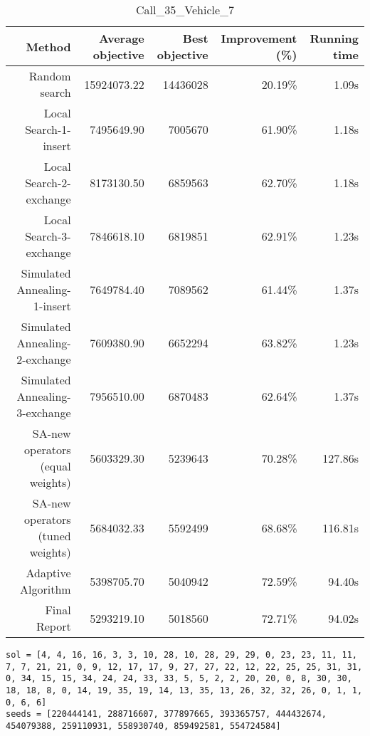 \begin{table}[ht]
\centering
\caption{Call\_35\_Vehicle\_7}
\label{tab:call35vehicle7}
\begin{tabular}{|r|r|r|r|r|}
Method & Average objective & Best objective & Improvement (\%) & Running time \\
\hline
Random search & 15924073.22 & 14436028 & 20.19\% & 1.09s\\
Local Search-1-insert & 7495649.90 & 7005670 & 61.90\% & 1.18s\\
Local Search-2-exchange & 8173130.50 & 6859563 & 62.70\% & 1.18s\\
Local Search-3-exchange & 7846618.10 & 6819851 & 62.91\% & 1.23s\\
Simulated Annealing-1-insert & 7649784.40 & 7089562 & 61.44\% & 1.37s\\
Simulated Annealing-2-exchange & 7609380.90 & 6652294 & 63.82\% & 1.23s\\
Simulated Annealing-3-exchange & 7956510.00 & 6870483 & 62.64\% & 1.37s\\
SA-new operators (equal weights) & 5603329.30 & 5239643 & 70.28\% & 127.86s\\
SA-new operators (tuned weights) & 5684032.33 & 5592499 & 68.68\% & 116.81s\\
Adaptive Algorithm & 5398705.70 & 5040942 & 72.59\% & 94.40s\\
Final Report & 5293219.10 & 5018560 & 72.71\% & 94.02s\\
\end{tabular}%
\end{table}
\begin{lstlisting}[label={lst:call35vehicle7},caption=Optimal solution call\_35\_vehicle\_7]
sol = [4, 4, 16, 16, 3, 3, 10, 28, 10, 28, 29, 29, 0, 23, 23, 11, 11, 7, 7, 21, 21, 0, 9, 12, 17, 17, 9, 27, 27, 22, 12, 22, 25, 25, 31, 31, 0, 34, 15, 15, 34, 24, 24, 33, 33, 5, 5, 2, 2, 20, 20, 0, 8, 30, 30, 18, 18, 8, 0, 14, 19, 35, 19, 14, 13, 35, 13, 26, 32, 32, 26, 0, 1, 1, 0, 6, 6]
seeds = [220444141, 288716607, 377897665, 393365757, 444432674, 454079388, 259110931, 558930740, 859492581, 554724584]
\end{lstlisting}%
\clearpage


